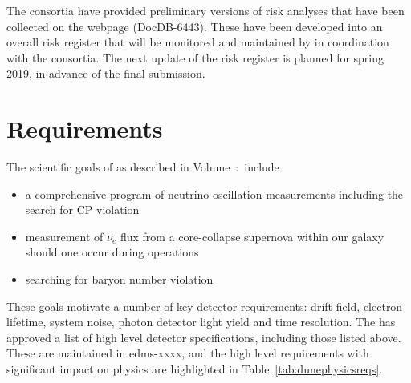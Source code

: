 The consortia have provided preliminary versions of risk analyses that
have been collected on the  webpage (DocDB-6443). These have
been developed into an overall risk register that will be monitored
and maintained by  in coordination with the consortia.  The
next update of the risk register is planned for spring 2019, in
advance of the final  submission.

\section{Requirements}
\label{sec:fdsp-coord-requirements}

The scientific goals of  as described in 
 Volume~\volnumberexec:~\voltitleexec include
\begin{itemize}
\item a comprehensive program of neutrino oscillation measurements
  including the search for CP violation
\item measurement of $\nu_{e}$ flux from a core-collapse supernova within our
  galaxy should one occur during  operations
\item searching for baryon number violation
\end{itemize}
These goals motivate a number of key detector requirements: drift
field, electron lifetime, system noise, photon detector light yield
and time resolution. The  has approved a list of high
level detector specifications, including those listed above. These are
maintained in edms-xxxx, and the high level requirements with
significant impact on physics are highlighted in
Table~\ref{tab:dunephysicsreqs}.
